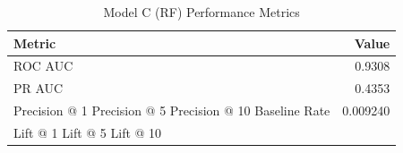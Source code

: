 \begin{table}[h]
\centering
\begin{tabular}{lr}
\toprule
Metric & Value \\
\midrule
ROC AUC & 0.9308 \\
PR AUC & 0.4353 \\
Precision @ 1%
Precision @ 5%
Precision @ 10%
Baseline Rate & 0.009240 \\
Lift @ 1%
Lift @ 5%
Lift @ 10%
\bottomrule
\end{tabular}
\caption{Model C (RF) Performance Metrics}
\label{tab:modelc_rf_metrics}
\end{table}
